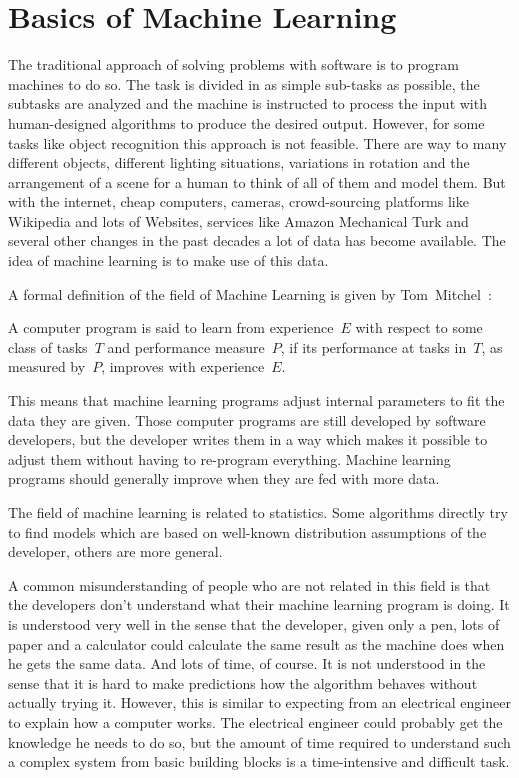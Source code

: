 
\section{Basics of Machine Learning}
\label{sec:ml-basics}
The traditional approach of solving problems with software is to program
machines to do so. The task is divided in as simple sub-tasks as possible,
the subtasks are analyzed and the machine is instructed to process the input
with human-designed algorithms to produce the desired output. However, for
some tasks like object recognition this approach is not feasible. There are
way to many different objects, different lighting situations, variations in
rotation and the arrangement of a scene for a human to think of all of them and
model them. But with the internet, cheap computers, cameras, crowd-sourcing
platforms like Wikipedia and lots of Websites, services like Amazon Mechanical
Turk and several other changes in the past decades a lot of data has become
available. The idea of machine learning is to make use of this data.

A formal definition of the field of Machine Learning is given by
Tom~Mitchel~\cite{Mitchell97}:
\begin{displayquote}
A computer program is said to learn from experience~$E$ with respect to some
class of tasks~$T$ and performance measure~$P$, if its performance at tasks
in~$T$, as measured by~$P$, improves with experience~$E$.
\end{displayquote}

This means that machine learning programs adjust internal parameters to fit the
data they are given. Those computer programs are still developed by software
developers, but the developer writes them in a way which makes it possible to
adjust them without having to re-program everything. Machine learning programs
should generally improve when they are fed with more data.

The field of machine learning is related to statistics. Some algorithms
directly try to find models which are based on well-known distribution
assumptions of the developer, others are more general.

A common misunderstanding of people who are not related in this field is that
the developers don't understand what their machine learning program is doing.
It is understood very well in the sense that the developer, given only a pen,
lots of paper and a calculator could calculate the same result as the machine
does when he gets the same data. And lots of time, of course. It is not
understood in the sense that it is hard to make predictions how the algorithm
behaves without actually trying it. However, this is similar to expecting from
an electrical engineer to explain how a computer works. The electrical engineer
could probably get the knowledge he needs to do so, but the amount of time
required to understand such a complex system from basic building blocks is
a time-intensive and difficult task.


